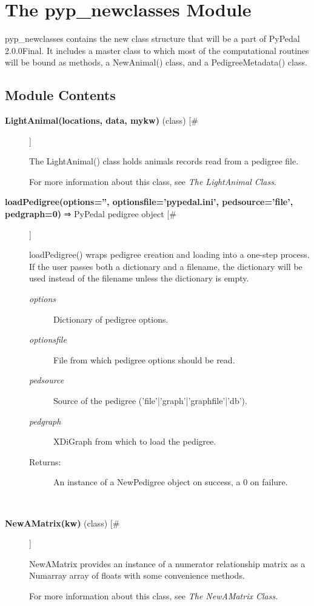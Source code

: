 \documentclass{article}
\begin{document}
\section*{The pyp\_newclasses Module}
\par pyp\_newclasses contains the new class structure that will be a part of PyPedal 2.0.0Final.
It includes a master class to which most of the computational routines will be bound as
methods, a NewAnimal() class, and a PedigreeMetadata() class.
\subsection*{Module Contents}
\begin{description}
\item[\textbf{LightAnimal(locations, data, mykw)} (class) [\#]
]
\par The LightAnimal() class holds animals records read from a pedigree file.
\par For more information about this class, see \textit{The LightAnimal Class}.

\item[\textbf{loadPedigree(options='', optionsfile='pypedal.ini', pedsource='file', pedgraph=0)} ⇒ PyPedal pedigree object [\#]
]
\par loadPedigree() wraps pedigree creation and loading into a one-step
process.  If the user passes both a dictionary and a filename, the
dictionary will be used instead of the filename unless the dictionary
is empty.
\begin{description}
\item[\textit{options}
]
Dictionary of pedigree options.
\item[\textit{optionsfile}
]
File from which pedigree options should be read.
\item[\textit{pedsource}
]
Source of the pedigree ('file'|'graph'|'graphfile'|'db').
\item[\textit{pedgraph}
]
XDiGraph from which to load the pedigree.
\item[Returns:
]
An instance of a NewPedigree object on success, a 0 on failure.
\end{description}\\

\item[\textbf{NewAMatrix(kw)} (class) [\#]
]
\par NewAMatrix provides an instance of a numerator relationship matrix as a Numarray array of
floats with some convenience methods.
\par For more information about this class, see \textit{The NewAMatrix Class}.


\end{description}
\end{document}
